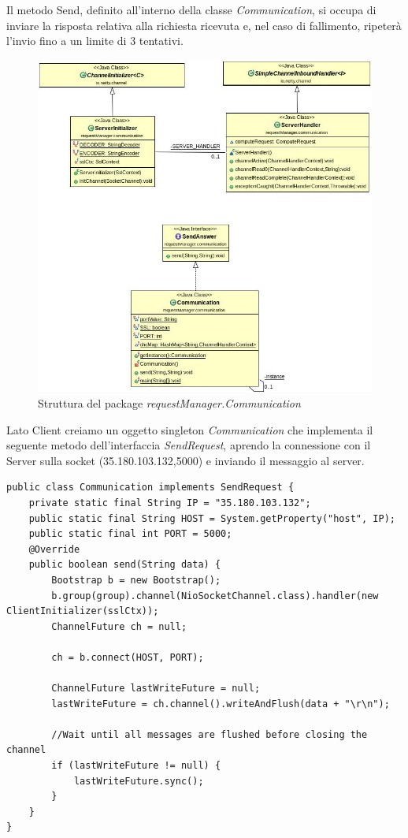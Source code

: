 Il metodo Send, definito all'interno della classe \textit{Communication}, si occupa di inviare la risposta relativa alla richiesta ricevuta e, nel caso di fallimento, ripeterà l'invio fino a un limite di 3 tentativi.
\begin{figure}[h]
	\includegraphics[width=\textwidth]{Immagini/CommunicationPackageServer}
	\caption{Struttura del package \textit{requestManager.Communication}}
	\label{fig:requestManager}
\end{figure}
\newpage
Lato Client creiamo un oggetto singleton \textit{Communication} che implementa il seguente metodo dell'interfaccia \textit{SendRequest}, aprendo la connessione con il Server sulla socket (35.180.103.132,5000) e inviando il messaggio al server.

\begin{lstlisting}[caption={Connessione con server e invio del messaggio},captionpos=b]
public class Communication implements SendRequest {
	private static final String IP = "35.180.103.132";
	public static final String HOST = System.getProperty("host", IP);
	public static final int PORT = 5000;
	@Override
	public boolean send(String data) {
		Bootstrap b = new Bootstrap();
		b.group(group).channel(NioSocketChannel.class).handler(new ClientInitializer(sslCtx));
		ChannelFuture ch = null;
		
		ch = b.connect(HOST, PORT);
		
		ChannelFuture lastWriteFuture = null;
		lastWriteFuture = ch.channel().writeAndFlush(data + "\r\n");
		
		//Wait until all messages are flushed before closing the channel
		if (lastWriteFuture != null) {
			lastWriteFuture.sync();
		}		
	}
}
\end{lstlisting}

